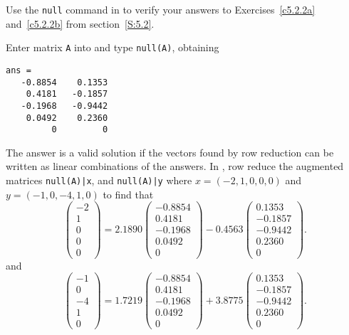 \documentclass{ximera}
\begin{document}
\begin{computerExercise} \label{c5.3.2}
Use the {\tt null} command in \Matlab to verify your answers to
Exercises~\ref{c5.2.2a} and~\ref{c5.2.2b} from section~\ref{S:5.2}. 

\begin{solution}

\soln Enter matrix {\tt A} into \Matlab and type {\tt null(A)}, obtaining
\begin{verbatim}
ans =
   -0.8854    0.1353
    0.4181   -0.1857
   -0.1968   -0.9442
    0.0492    0.2360
         0         0
\end{verbatim}
The \Matlab answer is a valid solution if the vectors found
by row reduction can be written as linear combinations of the \Matlab
answers.  In \Matlab, row reduce the augmented matrices {\tt null(A)|x},
and {\tt null(A)|y} where $x = (-2,1,0,0,0)$ and $y = (-1,0,-4,1,0)$ 
to find that
\[
\left(\begin{array}{r} -2 \\ 1 \\ 0 \\ 0 \\ 0 \end{array}\right) =
2.1890\left(\begin{array}{r} -0.8854 \\ 0.4181 \\ -0.1968 \\ 0.0492 \\ 0 \end{array}\right) 
-0.4563 \left(\begin{array}{r} 0.1353 \\ -0.1857 \\ -0.9442 \\ 0.2360 \\ 0 \end{array}\right).
\]
and
\[
\left(\begin{array}{r} -1 \\ 0 \\ -4 \\ 1 \\ 0 \end{array}\right) =
1.7219\left(\begin{array}{r} -0.8854 \\ 0.4181 \\ -0.1968 \\ 0.0492 \\ 0 \end{array}\right) +
3.8775 \left(\begin{array}{r} 0.1353 \\ -0.1857 \\ -0.9442 \\ 0.2360 \\ 0 \end{array}\right).
\]


\end{solution}
\end{computerExercise}
\end{document}
